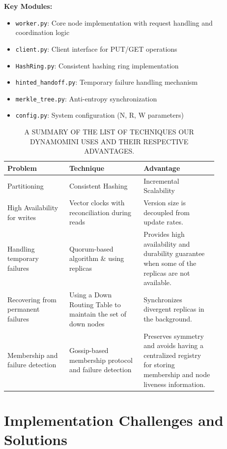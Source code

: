 \documentclass[conference]{IEEEtran}
\begin{document}
\textbf{Key Modules:}
\begin{itemize}
    \item \texttt{worker.py}: Core node implementation with request handling and coordination logic
    \item \texttt{client.py}: Client interface for PUT/GET operations
    \item \texttt{HashRing.py}: Consistent hashing ring implementation
    \item \texttt{hinted\_handoff.py}: Temporary failure handling mechanism
    \item \texttt{merkle\_tree.py}: Anti-entropy synchronization
    \item \texttt{config.py}: System configuration (N, R, W parameters)
\end{itemize}

\begin{table}[htbp]
\caption{A SUMMARY OF THE LIST OF TECHNIQUES OUR DYNAMOMINI USES AND THEIR RESPECTIVE ADVANTAGES.}
\begin{center}
\begin{tabular}{|p{0.25\linewidth}|p{0.3\linewidth}|p{0.3\linewidth}|}
\hline
\textbf{Problem} & \textbf{Technique} & \textbf{Advantage} \\
\hline
Partitioning & Consistent Hashing & Incremental Scalability \\
\hline
High Availability for writes & Vector clocks with reconciliation during reads & Version size is decoupled from update rates. \\
\hline
Handling temporary failures & Quorum-based algorithm \& using replicas & Provides high availability and durability guarantee when some of the replicas are not available. \\
\hline
Recovering from permanent failures & Using a Down Routing Table to maintain the set of down nodes & Synchronizes divergent replicas in the background. \\
\hline
Membership and failure detection & Gossip-based membership protocol and failure detection & Preserves symmetry and avoids having a centralized registry for storing membership and node liveness information. \\
\hline
\end{tabular}
\label{tab:summary}
\end{center}
\end{table} %

\section{Implementation Challenges and Solutions}
\end{document}
